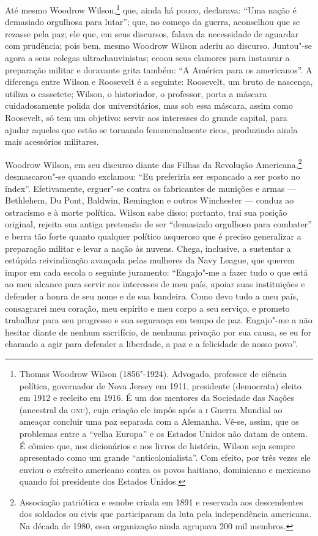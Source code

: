 Até mesmo Woodrow Wilson,\footnote{ Thomas 
Woodrow Wilson (1856"-1924). Advogado, professor de ciência
política, governador de Nova Jersey em 1911, presidente (democrata)
eleito em 1912 e reeleito em 1916. É um dos mentores da
Sociedade das Nações (ancestral da \textsc{onu}), cuja criação ele impôs após a
\textsc{i} Guerra Mundial ao ameaçar concluir uma paz separada com a Alemanha.
Vê-se, assim, que os problemas entre a “velha Europa” e os Estados Unidos não
datam de ontem. É cômico que, nos dicionários e nos livros de história,
Wilson seja sempre apresentado como um grande “anticolonialista”. Com
efeito, por três vezes ele enviou o exército americano contra os povos
haitiano, dominicano e mexicano quando foi presidente dos Estados
Unidos.}
que, ainda há pouco, declarava: “Uma nação é
demasiado orgulhosa para lutar”; que, no começo da guerra, aconselhou
que se rezasse pela paz; ele que, em seus discursos, falava da
necessidade de aguardar com prudência; pois bem, mesmo Woodrow Wilson
aderiu ao discurso. Juntou"-se agora a seus colegas ultrachauvinistas;
ecoou seus clamores para instaurar a preparação militar e doravante
grita também: “A América para os americanos”. A diferença entre Wilson
e Roosevelt é a seguinte: Roosevelt, um bruto de nascença, utiliza o
cassetete; Wilson, o historiador, o professor, porta a máscara
cuidadosamente polida dos universitários, mas sob essa máscara, assim
como Roosevelt, só tem um objetivo: servir aos interesses do grande
capital, para ajudar aqueles que estão se tornando fenomenalmente
ricos, produzindo ainda mais acessórios militares.

Woodrow Wilson, em seu discurso diante das Filhas da Revolução
Americana,\footnote{ Associação patriótica e esnobe criada
em 1891 e reservada aos descendentes dos soldados ou civis que
participaram da luta pela independência americana. Na década de 1980, 
essa organização ainda agrupava 200 mil membros.} 
desmascarou"-se quando exclamou: “Eu preferiria ser
espancado a ser posto no índex”. Efetivamente, erguer"-se contra os
fabricantes de munições e armas --- Bethlehem, Du Pont, Baldwin,
Remington e outros Winchester --- conduz ao ostracismo e à morte política.
Wilson sabe disso; portanto, trai sua posição original, rejeita sua
antiga pretensão de ser “demasiado orgulhoso para combater” e berra tão
forte quanto qualquer político asqueroso que é preciso generalizar a
preparação militar e levar a nação às nuvens. Chega, inclusive, a
sustentar a estúpida reivindicação avançada pelas mulheres da Navy
League, que querem impor em cada escola o seguinte juramento:
“Engajo"-me a fazer tudo o que está ao meu alcance para servir aos
interesses de meu país, apoiar suas instituições e defender a honra de
seu nome e de sua bandeira. Como devo tudo a meu país, consagrarei meu
coração, meu espírito e meu corpo a seu serviço, e prometo trabalhar
para seu progresso e sua segurança em tempo de paz. Engajo"-me a não
hesitar diante de nenhum sacrifício, de nenhuma privação por sua causa,
se eu for chamado a agir para defender a liberdade, a paz e a
felicidade de nosso povo”.

